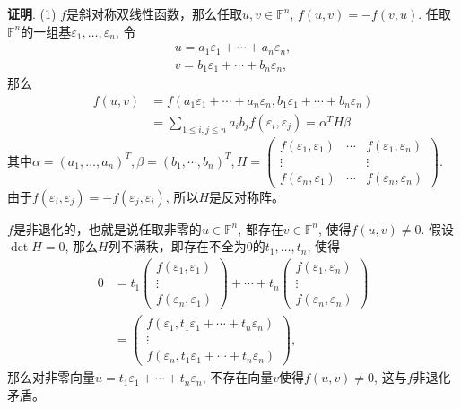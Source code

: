 \newpageorvspace

{\bf 证明}. (1) $f$是斜对称双线性函数，那么任取$u, v \in \mathbb{F}^n$, $f(u, v) = - f(v, u)$. 任取$\mathbb{F}^n$的一组基$\varepsilon_1, \ldots, \varepsilon_n$, 令
\begin{align*}
u = a_1 \varepsilon_1 + \cdots + a_n \varepsilon_n, \\
v = b_1 \varepsilon_1 + \cdots + b_n \varepsilon_n,
\end{align*}
那么
\begin{align*}
f(u, v) & = f(a_1 \varepsilon_1 + \cdots + a_n \varepsilon_n, b_1 \varepsilon_1 + \cdots + b_n \varepsilon_n) \\
& = \sum\limits_{1 \leqslant i,j \leqslant n} a_i b_j f(\varepsilon_i, \varepsilon_j) = \alpha^T H \beta
\end{align*}
其中$\alpha = (a_1, \ldots, a_n)^T, \beta = (b_1, \cdots, b_n)^T, H = \begin{pmatrix} f(\varepsilon_1, \varepsilon_1) & \cdots & f(\varepsilon_1, \varepsilon_n) \\ \vdots & & \vdots \\ f(\varepsilon_n, \varepsilon_1) & \cdots & f(\varepsilon_n, \varepsilon_n) \end{pmatrix}.$ 由于$f(\varepsilon_i, \varepsilon_j) = - f(\varepsilon_j, \varepsilon_i)$, 所以$H$是反对称阵。

$f$是非退化的，也就是说任取非零的$u \in \mathbb{F}^n$, 都存在$v \in \mathbb{F}^n$, 使得$f(u, v) \neq 0$. 假设$\det H = 0$, 那么$H$列不满秩，即存在不全为$0$的$t_1, \ldots, t_n$, 使得
\begin{align*}
0 & = t_1 \begin{pmatrix} f(\varepsilon_1, \varepsilon_1) \\ \vdots \\ f(\varepsilon_n, \varepsilon_1) \end{pmatrix} + \cdots + t_n \begin{pmatrix} f(\varepsilon_1, \varepsilon_n) \\ \vdots \\ f(\varepsilon_n, \varepsilon_n) \end{pmatrix} \\
& = \begin{pmatrix} f(\varepsilon_1, t_1 \varepsilon_1 + \cdots + t_n \varepsilon_n) \\ \vdots \\ f(\varepsilon_n, t_1 \varepsilon_1 + \cdots + t_n \varepsilon_n) \end{pmatrix},
\end{align*}
那么对非零向量$u = t_1 \varepsilon_1 + \cdots + t_n \varepsilon_n$, 不存在向量$v$使得$f(u, v) \neq 0$, 这与$f$非退化矛盾。

